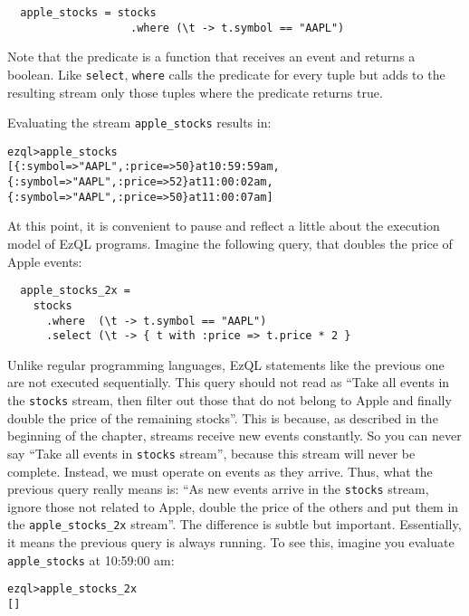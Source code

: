 \documentclass{report}
\newenvironment{evaluation}
{
  \framed
  \begin{alltt}
}
{
  \end{alltt}
  \endframed
}
\begin{document}
\begin{verbatim}
  apple_stocks = stocks
                   .where (\t -> t.symbol == "AAPL")
\end{verbatim}

Note that the predicate is a function that receives an event and
returns a boolean. Like \verb=select=, \verb=where= calls the
predicate for every tuple but adds to the resulting stream only those
tuples where the predicate returns true.

Evaluating the stream \verb=apple_stocks= results in:

\begin{evaluation}
  ezql> apple_stocks
  [\{ :symbol => "AAPL", :price => 50 \} at 10:59:59 am,
   \{ :symbol => "AAPL", :price => 52 \} at 11:00:02 am,
   \{ :symbol => "AAPL", :price => 50 \} at 11:00:07 am]
\end{evaluation}

At this point, it is convenient to pause and reflect a little about
the execution model of EzQL programs. Imagine the following query,
that doubles the price of Apple events:

\begin{verbatim}
  apple_stocks_2x =
    stocks
      .where  (\t -> t.symbol == "AAPL")
      .select (\t -> { t with :price => t.price * 2 }
\end{verbatim}

Unlike regular programming languages, EzQL statements like the
previous one are not executed sequentially. This query should not read
as ``Take all events in the \verb=stocks= stream, then filter out
those that do not belong to Apple and finally double the price of the
remaining stocks''. This is because, as described in the beginning of
the chapter, streams receive new events constantly. So you can never
say ``Take all events in \verb=stocks= stream'', because this stream
will never be complete. Instead, we must operate on events as they
arrive. Thus, what the previous query really means is: ``As new events
arrive in the \verb=stocks= stream, ignore those not related to Apple,
double the price of the others and put them in the
\verb=apple_stocks_2x= stream''. The difference is subtle but
important. Essentially, it means the previous query is always
running. To see this, imagine you evaluate \verb=apple_stocks= at
10:59:00 am:

\begin{evaluation}
  ezql> apple_stocks_2x
  []
\end{evaluation}
\end{document}
